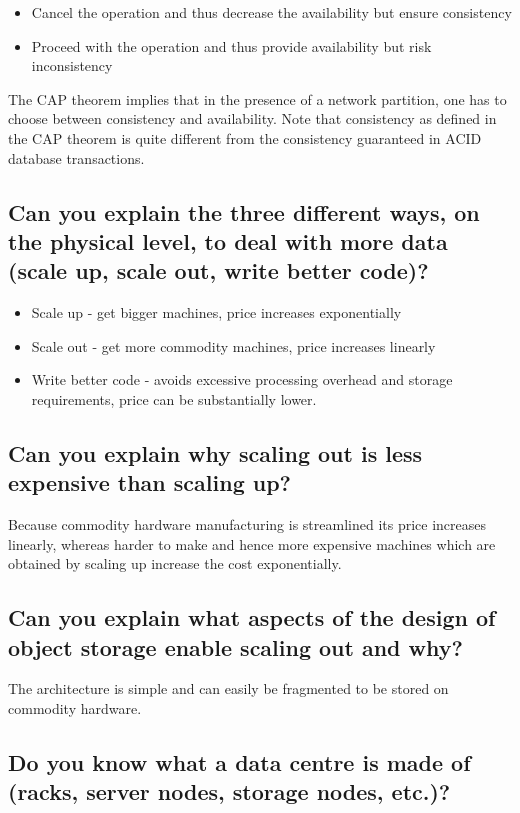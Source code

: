 \documentclass{article}
\begin{document}
\begin{itemize}
\item Cancel the operation and thus decrease the availability but ensure consistency
\item Proceed with the operation and thus provide availability but risk inconsistency
\end{itemize}

The CAP theorem implies that in the presence of a network partition, one has to choose between consistency and availability. Note that consistency as defined in the CAP theorem is quite different from the consistency guaranteed in ACID database transactions.

\subsection{Can you explain the three different ways, on the physical level, to deal with more data (scale up, scale out, write better code)?}

\begin{itemize}
\item Scale up - get bigger machines, price increases exponentially
\item Scale out - get more commodity machines, price increases linearly
\item Write better code - avoids excessive processing overhead and storage requirements, price can be substantially lower.
\end{itemize}

\subsection{Can you explain why scaling out is less expensive than scaling up?}

Because commodity hardware manufacturing is streamlined its price increases linearly, whereas harder to make and hence more expensive machines which are obtained by scaling up increase the cost exponentially.

\subsection{Can you explain what aspects of the design of object storage enable scaling out and why?}

The architecture is simple and can easily be fragmented to be stored on commodity hardware.

\subsection{Do you know what a data centre is made of (racks, server nodes, storage nodes, etc.)?}
\end{document}
